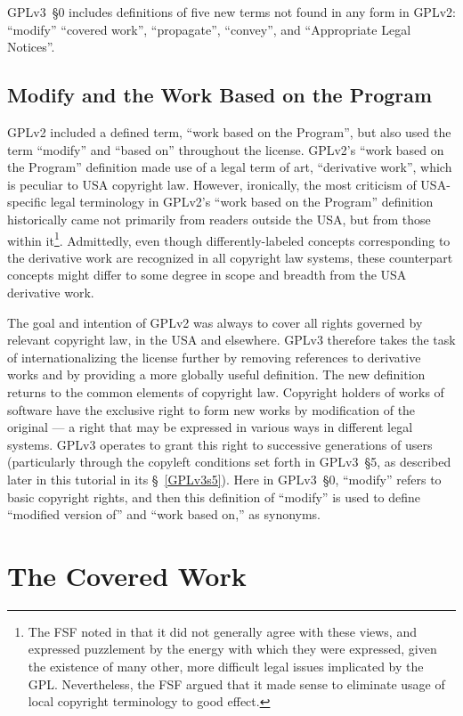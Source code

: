 GPLv3~\S0 includes definitions of five new terms not found in any form in
GPLv2: ``modify'' ``covered work'', ``propagate'', ``convey'', and
``Appropriate Legal Notices''. 

\subsection{Modify and the Work Based on the Program}

GPLv2 included a defined term, ``work based on the Program'', but also used
the term ``modify'' and ``based on'' throughout the license.  GPLv2's ``work
based on the Program'' definition made use of a legal term of art,
``derivative work'', which is peculiar to USA copyright law.  However,
ironically, the most criticism of USA-specific legal terminology in GPLv2's
``work based on the Program'' definition historically came not primarily from
readers outside the USA, but from those within it\footnote{The FSF noted in
  that it did not generally agree with these views, and expressed puzzlement
  by the energy with which they were expressed, given the existence of many
  other, more difficult legal issues implicated by the GPL.  Nevertheless,
  the FSF argued that it made sense to eliminate usage of local copyright
  terminology to good effect.}.  Admittedly, even though differently-labeled
concepts corresponding to the derivative work are recognized in all copyright
law systems, these counterpart concepts might differ to some degree in scope
and breadth from the USA derivative work.

The goal and intention of GPLv2 was always to cover all rights governed by
relevant copyright law, in the USA and elsewhere.  GPLv3 therefore takes the
task of internationalizing the license further by removing references to
derivative works and by providing a more globally useful definition.  The new
definition returns to the common elements of copyright law.  Copyright
holders of works of software have the exclusive right to form new works by
modification of the original --- a right that may be expressed in various
ways in different legal systems.  GPLv3 operates to grant this right to
successive generations of users (particularly through the copyleft conditions
set forth in GPLv3~\S5, as described later in this tutorial in its
\S~\ref{GPLv3s5}).  Here in GPLv3~\S0, ``modify'' refers to basic copyright
rights, and then this definition of ``modify'' is used to define ``modified
version of'' and ``work based on,'' as synonyms.

\section{The Covered Work}

